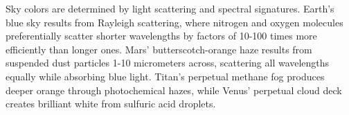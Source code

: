 Sky colors are determined by light scattering and spectral signatures. Earth's blue sky results from Rayleigh scattering, where nitrogen and oxygen molecules preferentially scatter shorter wavelengths by factors of 10-100 times more efficiently than longer ones. Mars' butterscotch-orange haze results from suspended dust particles 1-10 micrometers across, scattering all wavelengths equally while absorbing blue light. Titan's perpetual methane fog produces deeper orange through photochemical hazes, while Venus' perpetual cloud deck creates brilliant white from sulfuric acid droplets.